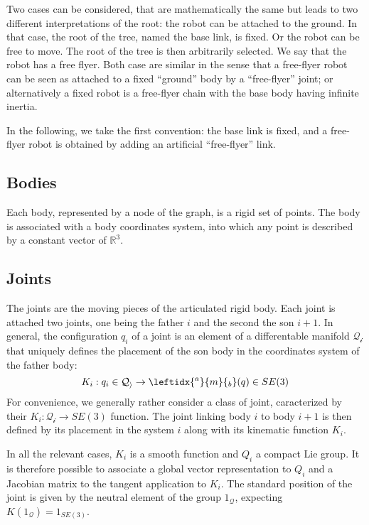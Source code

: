 \documentclass{book}
\begin{document}
Two cases can be considered, that are mathematically the same but leads to two different interpretations of the root: the robot can be attached to the ground. In that case, the root of the tree, named the base link, is fixed. Or the robot can be free to move. The root of the tree is then arbitrarily selected. We say that the robot has a free flyer.
Both case are similar in the sense that a free-flyer robot can be seen as attached to a fixed ``ground'' body by a ``free-flyer'' joint; or alternatively a fixed robot is a free-flyer chain with the base body having infinite inertia.

In the following, we take the first convention: the base link is fixed, and a free-flyer robot is obtained by adding an artificial ``free-flyer'' link.

\subsection{Bodies}

Each body, represented by a node of the graph, is a rigid set of points. The body is associated with a body coordinates system, into which any point is described by a constant vector of $\mathbb{R}^3$. 

\subsection{Joints}

The joints are the moving pieces of the articulated rigid body. Each joint is attached two joints, one being the father $i$ and the second the son $i+1$. In general, the configuration $q_i$ of a joint is an element of a differentable manifold $\mathcal{Q_i}$ that uniquely defines the placement of the son body in the coordinates system of the father body:
\[ K_i: q_i \in \mathcal{Q_i} \rightarrow \leftidx{^a}{m}{_b}(q) \in SE(3) \]
For convenience, we generally rather consider a class of joint, caracterized by their $K_i : \mathcal{Q_i} \rightarrow SE(3)$ function. The joint linking body $i$ to body $i+1$ is then defined by its placement in the system $i$ along with its kinematic function $K_i$.

In all the relevant cases, $K_i$ is a smooth function and $Q_i$ a compact Lie group. It is therefore possible to associate a global vector representation to $Q_i$ and a Jacobian matrix to the tangent application to $K_i$. The standard position of the joint is given by the neutral element of the group $1_\mathcal{Q}$, expecting $K(1_\mathcal{Q}) = 1_{SE(3)}$.
\end{document}
